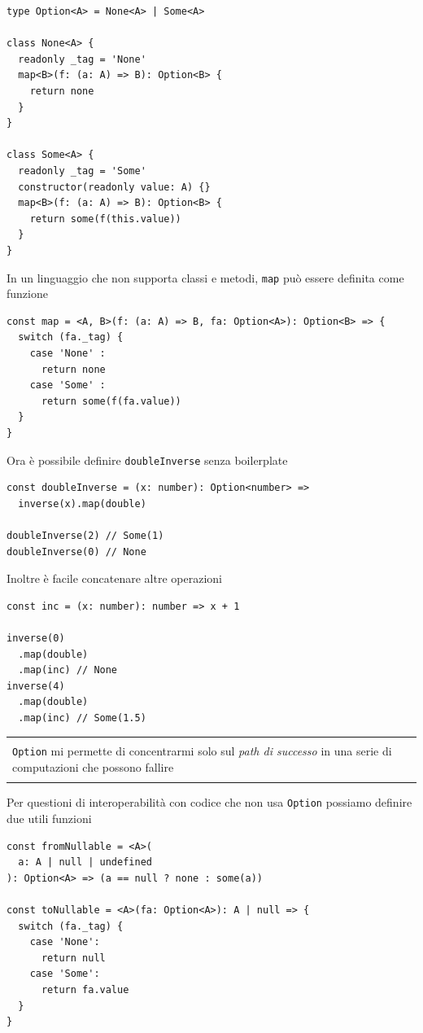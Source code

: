 \documentclass[12pt]{article}
\newenvironment{demo}
    {\begin{center}
    \begin{tabular}{|p{0.9\textwidth}|}
    \hline\\
    }
    {
    \\\\\hline
    \end{tabular}
    \end{center}
    }
\begin{document}
\begin{verbatim}
type Option<A> = None<A> | Some<A>

class None<A> {
  readonly _tag = 'None'
  map<B>(f: (a: A) => B): Option<B> {
    return none
  }
}

class Some<A> {
  readonly _tag = 'Some'
  constructor(readonly value: A) {}
  map<B>(f: (a: A) => B): Option<B> {
    return some(f(this.value))
  }
}
\end{verbatim}

In un linguaggio che non supporta classi e metodi, \texttt{map} può essere definita come funzione

\begin{verbatim}
const map = <A, B>(f: (a: A) => B, fa: Option<A>): Option<B> => {
  switch (fa._tag) {
    case 'None' :
      return none
    case 'Some' :
      return some(f(fa.value))
  }
}
\end{verbatim}


Ora è possibile definire \texttt{doubleInverse} senza boilerplate

\begin{verbatim}
const doubleInverse = (x: number): Option<number> =>
  inverse(x).map(double)

doubleInverse(2) // Some(1)
doubleInverse(0) // None
\end{verbatim}

Inoltre è facile concatenare altre operazioni

\begin{verbatim}
const inc = (x: number): number => x + 1

inverse(0)
  .map(double)
  .map(inc) // None
inverse(4)
  .map(double)
  .map(inc) // Some(1.5)
\end{verbatim}

\begin{demo}
\texttt{Option} mi permette di concentrarmi solo sul \emph{path di successo} in una serie di computazioni che possono fallire
\end{demo}

Per questioni di interoperabilità con codice che non usa \texttt{Option} possiamo definire due utili funzioni

\begin{verbatim}
const fromNullable = <A>(
  a: A | null | undefined
): Option<A> => (a == null ? none : some(a))

const toNullable = <A>(fa: Option<A>): A | null => {
  switch (fa._tag) {
    case 'None':
      return null
    case 'Some':
      return fa.value
  }
}
\end{verbatim}
\end{document}
